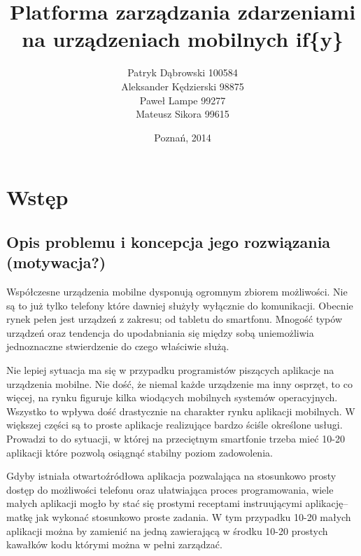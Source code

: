 \documentclass[11pt,a4paper,polish,thesis]{dcsbook}
\begin{document}
\author{Patryk Dąbrowski 100584\\ Aleksander Kędzierski 98875\\ Paweł Lampe 99277\\ Mateusz Sikora 99615}
\title{Platforma zarządzania zdarzeniami na urządzeniach mobilnych if\{y\}}
\date{Poznań, 2014}

\maketitle

\frontmatter

\tableofcontents{}

\mainmatter

\chapter{Wstęp}
\section{Opis problemu i koncepcja jego rozwiązania (motywacja?)}
Współczesne urządzenia mobilne dysponują ogromnym zbiorem możliwości. Nie są to już tylko telefony które dawniej służyły wyłącznie do komunikacji. Obecnie rynek pełen
jest urządzeń z zakresu; od tabletu do smartfonu. Mnogość typów urządzeń oraz tendencja do upodabniania się między sobą uniemożliwia jednoznaczne stwierdzenie do
czego właściwie służą.

Nie lepiej sytuacja ma się w przypadku programistów piszących aplikacje na urządzenia mobilne. Nie dość, że niemal każde urządzenie ma inny osprzęt, to co więcej, na
rynku figuruje kilka wiodących mobilnych systemów operacyjnych. Wszystko to wpływa dość drastycznie na charakter rynku aplikacji mobilnych. W większej części są to
proste aplikacje realizujące bardzo ściśle określone usługi. Prowadzi to do sytuacji, w której na przeciętnym smartfonie trzeba mieć 10-20 aplikacji które pozwolą osiągnąć stabilny poziom zadowolenia.

Gdyby istniała otwartoźródłowa aplikacja pozwalająca na stosunkowo prosty dostęp do możliwości telefonu oraz ułatwiająca proces programowania, wiele małych aplikacji
mogło by stać się prostymi receptami instruującymi aplikację--matkę jak wykonać stosunkowo proste zadania. W tym przypadku 10-20 małych aplikacji można by zamienić
na jedną zawierającą w środku 10-20 prostych kawałków kodu którymi można w pełni zarządzać.
\end{document}
